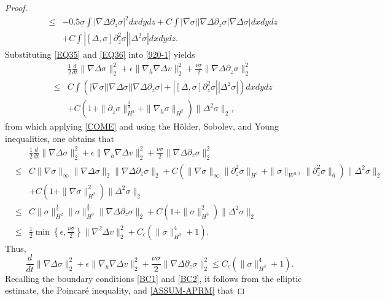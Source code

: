 \documentclass[12pt,reqno]{amsart}
\numberwithin{equation}{section}
\begin{document}
\begin{proof}
\begin{eqnarray}
  &\leq&-0.5\underline\sigma\int|\nabla\Delta\partial_z\sigma|^2dxdydz+C\int|\nabla\sigma||\nabla\Delta\partial_z\sigma|\nabla\Delta\sigma|dxdydz\nonumber\\
  &&+C\int|[\Delta,\sigma]\partial_z^2\sigma||\Delta^2\sigma|dxdydz.\label{EQ36}
\end{eqnarray}
Substituting \eqref{EQ35} and \eqref{EQ36} into \eqref{920-1} yields
\begin{eqnarray}
  &&\frac12\frac{d}{dt}\|\nabla\Delta\sigma\|_2^2+\epsilon\|\nabla_h\nabla\Delta v\|_2^2+\frac{\nu\underline\sigma}{2}\|\nabla\Delta\partial_z\sigma\|_2^2\nonumber\\
  &\leq& C\int(|\nabla\sigma||\nabla\Delta\sigma||\nabla\Delta\partial_z\sigma|+|[\Delta,\sigma]\partial_z^2\sigma||\Delta^2\sigma|)dxdydz\nonumber\\
  &&+C\left(1+\|\partial_z\sigma\|_{H^2}^\frac32+\|\nabla_h\sigma\|_{H^2}\right)\|\Delta^2\sigma\|_2,
\end{eqnarray}
from which applying \eqref{COME} and using the H\"older, Sobolev, and Young inequalities, one obtains that
\begin{eqnarray*}
  &&\frac12\frac{d}{dt}\|\nabla\Delta\sigma\|_2^2+\epsilon\|\nabla_h\nabla\Delta v\|_2^2+\frac{\nu\underline\sigma}{2}\|\nabla\Delta\partial_z\sigma\|_2^2\nonumber\\
  &\leq&C\|\nabla\sigma\|_\infty\|\nabla\Delta\sigma\|_2\|\nabla\Delta\partial_z\sigma\|_2+C(\|\nabla\sigma\|_\infty\|\partial_z^2\sigma\|_{H^1}+\|\sigma\|_{W^{2,3}}\|\partial_z^2\sigma\|_6)\|\Delta^2\sigma\|_2\nonumber\\
  &&+C(1+\|\nabla\sigma\|_{H^2}^2)\|\Delta^2\sigma\|_2\nonumber\\
  &\leq&C\|\sigma\|_{H^2}^\frac12\|\sigma\|_{H^3}^\frac32\|\nabla\Delta\partial_z\sigma\|_2
  +C(1+\|\sigma\|_{H^3}^2)\|\Delta^2\sigma\|_2\nonumber\\
  &\leq&\frac12\min\left\{\epsilon,\frac{\nu\underline\sigma}{2}\right\}\|\nabla^2\Delta v\|_2^2+C_\epsilon\left(\|\sigma\|_{H^3}^4+1\right).
\end{eqnarray*}
Thus,
\begin{equation}
  \frac{d}{dt}\|\nabla\Delta\sigma\|_2^2+\epsilon\|\nabla_h\nabla\Delta v\|_2^2+\frac{\nu\underline\sigma}{2}\|\nabla\Delta\partial_z\sigma\|_2^2
  \leq C_\epsilon(\|\sigma\|_{H^3}^4+1). \label{EQ37}
\end{equation}
Recalling the boundary conditions \eqref{BC1} and \eqref{BC2}, it follows from the elliptic estimate, the Poincar\'e inequality, and \eqref{ASSUM-APRM} that

\end{proof}
\end{document}
